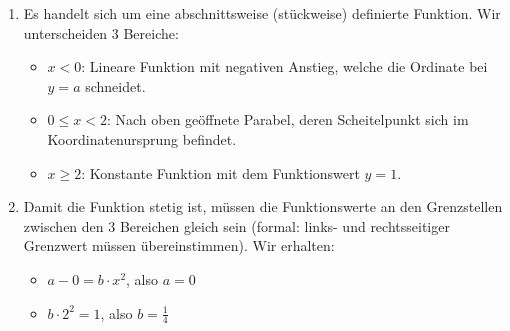 \item

\begin{enumerate}

\item Es handelt sich um eine abschnittsweise (stückweise) definierte Funktion. Wir unterscheiden 3 Bereiche:

\begin{itemize}
\item $x<0$: Lineare Funktion mit negativen Anstieg, welche die Ordinate bei $y=a$ schneidet.
\item $0\le x <2$: Nach oben geöffnete Parabel, deren Scheitelpunkt sich im Koordinatenursprung befindet.
\item $x \ge 2$: Konstante Funktion mit dem Funktionswert $y=1$.
\end{itemize}

\item Damit die Funktion stetig ist, müssen die Funktionswerte an den Grenzstellen zwischen den 3 Bereichen gleich sein (formal: links- und rechtsseitiger Grenzwert müssen übereinstimmen). Wir erhalten:

\begin{itemize}
\item $a-0 = b \cdot x^2$, also $a=0$
\item $b\cdot 2^2 = 1$, also $b=\frac{1}{4}$
\end{itemize}

\end{enumerate}

